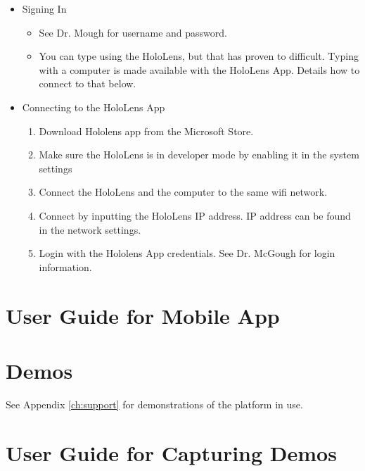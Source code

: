 \begin{itemize}
    \item Signing In
        \begin{itemize}
            \item See Dr. Mough for username and password. 

            \item You can type using the HoloLens, but that has proven to difficult. Typing with a computer is made available with the HoloLens App. Details how to connect to that below.
        \end{itemize}

    \item Connecting to the HoloLens App
        \begin{enumerate}
            \item Download Hololens app from the Microsoft Store.
            \item Make sure the HoloLens is in developer mode by enabling it in the system settings
            \item Connect the HoloLens and the computer to the same wifi network.
            \item Connect by inputting the HoloLens IP address. IP address can be found in the network settings.
            \item Login with the Hololens App credentials. See Dr. McGough for login information.
        \end{enumerate}

\end{itemize}


\section{User Guide for Mobile App}

\section{Demos}

See Appendix \ref{ch:support} for demonstrations of the platform in use. 

\section{User Guide for Capturing Demos}

